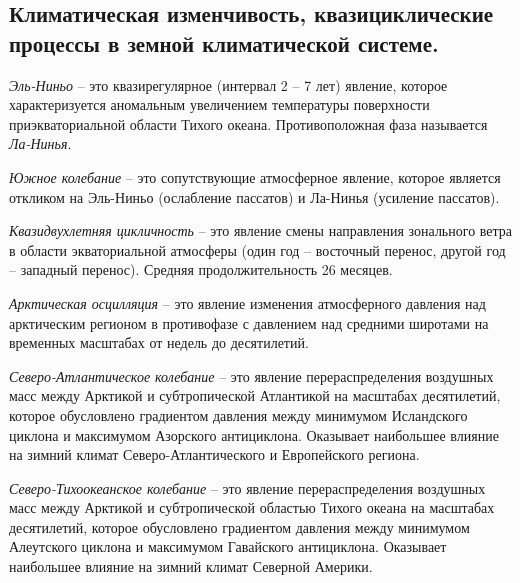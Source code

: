 \subsection{Климатическая изменчивость, квазициклические процессы в земной климатической системе.}
\textit{Эль-Ниньо} -- это квазирегулярное (интервал 2 -- 7 лет) явление, которое характеризуется аномальным увеличением температуры поверхности приэкваториальной области Тихого океана.
Противоположная фаза называется \textit{Ла-Нинья}.

\textit{Южное колебание} -- это сопутствующие атмосферное явление, которое является откликом на Эль-Ниньо (ослабление пассатов) и Ла-Нинья (усиление пассатов).

\textit{Квазидвухлетняя цикличность} -- это явление смены направления зонального ветра в области экваториальной атмосферы (один год -- восточный перенос, другой год -- западный перенос). Средняя продолжительность 26 месяцев.

\textit{Арктическая осцилляция} -- это явление изменения атмосферного давления над арктическим регионом в противофазе с давлением над средними широтами на временных масштабах от недель до десятилетий.

\textit{Северо-Атлантическое колебание} -- это явление перераспределения воздушных масс между Арктикой и субтропической Атлантикой на масштабах десятилетий, которое обусловлено градиентом давления между минимумом Исландского циклона и максимумом Азорского антициклона.
Оказывает наибольшее влияние на зимний климат Северо-Атлантического и Европейского региона.

\textit{Северо-Тихоокеанское колебание} -- это явление перераспределения воздушных масс между Арктикой и субтропической областью Тихого океана на масштабах десятилетий, которое обусловлено градиентом давления между минимумом Алеутского циклона и максимумом Гавайского антициклона.
Оказывает наибольшее влияние на зимний климат Северной Америки.
